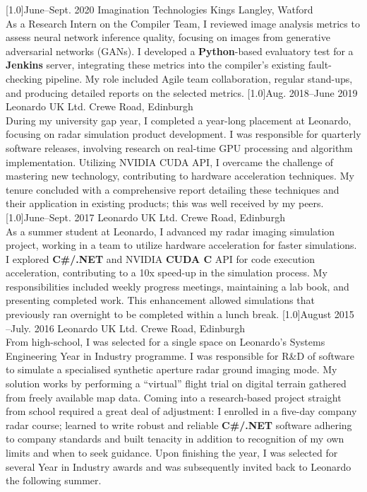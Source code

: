 \documentclass[]{cv-style}     %
\begin{document}
\begin{entrylist}
{%
}
\entry
  {\scalebox{.8}[1.0]{June--Sept.  2020}}
  {Imagination Technologies}
  {Kings Langley, Watford}
  {\\
 As a Research Intern on the Compiler Team, I reviewed image analysis metrics to assess neural network inference quality, focusing on images from generative adversarial networks (GANs). I developed a \textbf{Python}-based evaluatory test for a \textbf{Jenkins} server, integrating these metrics into the compiler's existing fault-checking pipeline. My role included Agile team collaboration, regular stand-ups, and producing detailed reports on the selected metrics.
 }
\entry
  {\scalebox{.8}[1.0]{Aug. 2018--June 2019}}
  {Leonardo UK Ltd.}
  {Crewe Road, Edinburgh}
  {\\
  During my university gap year, I completed a year-long placement at Leonardo, focusing on radar simulation product development. I was responsible for quarterly software releases, involving research on real-time GPU processing and algorithm implementation. Utilizing NVIDIA CUDA API, I overcame the challenge of mastering new technology, contributing to hardware acceleration techniques. My tenure concluded with a comprehensive report detailing these techniques and their application in existing products; this was well received by my peers.
}
\entry
  {\scalebox{.8}[1.0]{June--Sept. 2017}}
  {Leonardo UK Ltd.}
  {Crewe Road, Edinburgh}
  {\\
 As a summer student at Leonardo, I advanced my radar imaging simulation project, working in a team to utilize hardware acceleration for faster simulations. I explored \textbf{C#/.NET} and NVIDIA \textbf{CUDA C} API for code execution acceleration, contributing to a 10x speed-up in the simulation process. My responsibilities included weekly progress meetings, maintaining a lab book, and presenting completed work. This enhancement allowed simulations that previously ran overnight to be completed within a lunch break.
}
\entry
  {\scalebox{.8}[1.0]{August 2015 --July.  2016}}
  {Leonardo UK Ltd.}
  {Crewe Road, Edinburgh}
  {\\
 From high-school, I was selected for a single space on Leonardo's Systems Engineering Year in Industry programme. I was responsible for R\&D of software to simulate a specialised synthetic aperture radar ground imaging mode. My solution works by performing a ``virtual'' flight trial on digital terrain gathered from freely available map data.
 Coming into a research-based project straight from school required a great deal of adjustment: I enrolled in a five-day company radar course; learned to write robust and reliable \textbf{C\#/.NET} software adhering to company standards and built tenacity in addition to recognition of my own limits and when to seek guidance.
 Upon finishing the year, I was selected for several Year in Industry awards and was subsequently invited back to Leonardo the following summer.
}



\end{entrylist}
\end{document}
